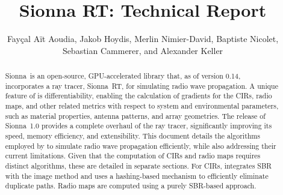 \documentclass[10pt,logo]{nvidiatechreport}
\begin{document}


\title{Sionna RT: Technical Report}
\author{Fayçal Aït Aoudia, Jakob Hoydis, Merlin Nimier-David, Baptiste Nicolet, Sebastian Cammerer, and Alexander Keller}

\maketitle


\begin{abstract}
	Sionna\texttrademark~is an open-source, GPU-accelerated library that, as of version 0.14, incorporates a ray tracer, Sionna~RT, for simulating radio wave propagation.
	A unique feature of \SRT{} is differentiability, enabling the calculation of gradients for the \glspl{CIR}, radio maps, and other related metrics with respect to system and environmental parameters, such as material properties, antenna patterns, and array geometries.
	The release of Sionna~1.0 provides a complete overhaul of the ray tracer, significantly improving its speed, memory efficiency, and extensibility.
	This document details the algorithms employed by \SRT{} to simulate radio wave propagation efficiently, while also addressing their current limitations.
	Given that the computation of \glspl{CIR} and radio maps requires distinct algorithms, these are detailed in separate sections.
	For \glspl{CIR}, \SRT{} integrates \gls{SBR} with the image method and uses a hashing-based mechanism to efficiently eliminate duplicate paths. Radio maps are computed using a purely \gls{SBR}-based approach.
\end{abstract}

\glsresetall

\abscontent


\newpage

\tableofcontents

\newpage


\end{document}
